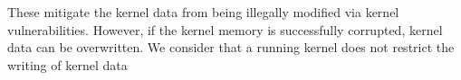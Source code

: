 These mitigate the kernel data from being illegally modified via kernel
vulnerabilities.
However, if the kernel memory is successfully corrupted, kernel data can be
overwritten.
%
%
We consider that a running kernel does not restrict the writing of kernel data

